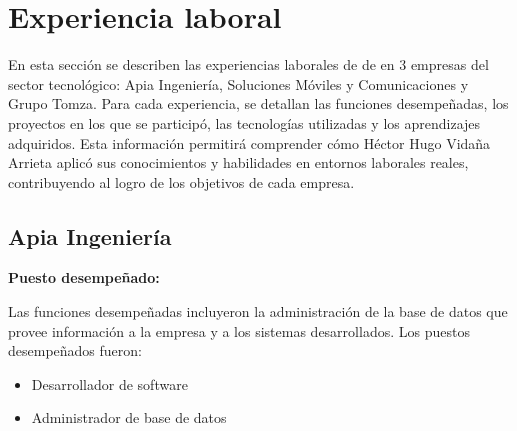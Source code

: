 \documentclass[protocolo.tex]{subfiles}
\begin{document}
\newpage 
\section{Experiencia laboral}

En esta sección se describen las experiencias laborales de 
de en 3 empresas del sector tecnológico: 
Apia Ingeniería, Soluciones Móviles y Comunicaciones y Grupo Tomza. 
Para cada experiencia, se detallan las funciones desempeñadas, 
los proyectos en los que se participó, las tecnologías utilizadas y 
los aprendizajes adquiridos. Esta información permitirá comprender cómo Héctor Hugo Vidaña Arrieta aplicó sus conocimientos y habilidades en entornos laborales reales, contribuyendo al logro de los objetivos de cada empresa.

\subsection{Apia Ingeniería}

\textbf{Puesto desempeñado:} 

Las funciones desempeñadas incluyeron la administración de la base de datos que provee información a la empresa y a los sistemas desarrollados.
Los puestos desempeñados fueron:

\begin{itemize}
\item Desarrollador de software
\item Administrador de base de datos
\end{itemize}
\end{document}
